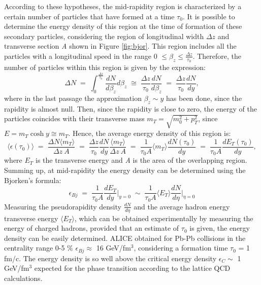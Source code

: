 %
According to these hypotheses, the mid-rapidity region is characterized by a certain number of particles that have formed at a time $\tau_{0}$. It is possible to determine the energy density of this region at the time of formation of these secondary particles, considering the region of longitudinal width $\Delta z$ and transverse section \textit{A} shown in Figure \ref{fig:bjor}. This region includes all the particles with a longitudinal speed in the range 0 $\leq \beta_{z} \leq \frac{\Delta z}{\tau_{0}}$. Therefore, the number of particles within this region is given by the expression:
\begin{equation}
 \Delta N \;=\; \int_{0}^{\frac{\Delta z}{\tau_{0}}} \frac{dN}{d\beta_{z}}d\beta_{z}\;\cong\;\frac{\Delta z}{\tau_{0}}\frac{dN}{d\beta_{z}}\;=\;\frac{\Delta z}{\tau_{0}}\frac{dN}{dy},
\end{equation}
where in the last passage the approximation $\beta_{z}\sim y$ has been done, since the rapidity is almost null. Then, since the rapidity is close to zero, the energy of the particles coincides with their transverse mass $m_{T} = \sqrt{m_{0}^{2} + p_{T}^{2}}$, since $E = m_{T} \cosh y \cong  m_{T}$. Hence, the average energy density of this region is:
\begin{equation}
 \langle \epsilon(\tau_{0}) \rangle \; = \; \frac{\Delta N\langle m_{T}\rangle}{\Delta z\:A}\;=\;\frac{\Delta z}{\tau_{0}}\frac{dN}{dy}\frac{\langle m_{T}\rangle}{\Delta z\:A}\;=\;\frac{1}{\tau_{0} A} \langle m_{T} \rangle \frac{dN(\tau_{0})}{dy}\;=\;\frac{1}{\tau_{0} A}\frac{dE_{T}(\tau_{0})}{dy},
\end{equation}
where $E_{T}$ is the transverse energy and \textit{A} is the area of the overlapping region.\\
Summing up, at mid-rapidity the energy density can be determined using the Bjorken's formula:
\begin{equation}
 \epsilon_{Bj}\;=\; \frac{1}{\tau_{0} A}\frac{dE_{T}}{dy}\Big|_{y=0}\;\sim\;\frac{1}{\tau_{0} A}\langle E_{T} \rangle \frac{dN}{d\eta}\Big|_{\eta=0}
\end{equation}
Measuring the pseudorapidity density $\frac{dN}{d\eta}$ and the average hadron energy transverse energy $\langle E_{T} \rangle$, which can be obtained experimentally by measuring the energy of charged hadrons, provided that an estimate of $\tau_{0}$ is given, the energy density can be easily determined. ALICE obtained for Pb-Pb collisions in the centrality range 0-5 \% $\epsilon_{Bj} \approx$ 16 GeV/fm$^{3}$, considering a formation time $\tau_{0}$ = 1 fm/c. The energy density is so well above the critical energy density $\epsilon_{C} \sim$ 1 GeV/fm$^{3}$ expected for the phase transition according to the lattice QCD calculations.\\

